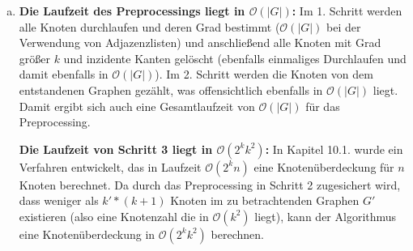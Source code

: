 \documentclass[12pt,a4paper]{article}
\begin{document}
\begin{enumerate}[a)]
	\item \textbf{Die Laufzeit des Preprocessings liegt in \(\mathcal{O}(|G|)\):} Im 1. Schritt werden alle Knoten durchlaufen und deren Grad bestimmt (\(\mathcal{O}(|G|)\) bei der Verwendung von Adjazenzlisten) und anschließend alle Knoten mit Grad größer \(k\) und inzidente Kanten gelöscht (ebenfalls einmaliges Durchlaufen und damit ebenfalls in \(\mathcal{O}(|G|)\)). Im 2. Schritt werden die Knoten von dem entstandenen Graphen gezählt, was offensichtlich ebenfalls in \(\mathcal{O}(|G|)\) liegt. Damit ergibt sich auch eine Gesamtlaufzeit von \(\mathcal{O}(|G|)\) für das Preprocessing.

	\textbf{Die Laufzeit von Schritt 3 liegt in \(\mathcal{O}(2^k k^2)\):} In Kapitel 10.1. wurde ein Verfahren entwickelt, das in Laufzeit \(\mathcal{O}(2^kn)\) eine Knotenüberdeckung für \(n\) Knoten berechnet. Da durch das Preprocessing in Schritt 2 zugesichert wird, dass weniger als \(k'*(k+1)\) Knoten im zu betrachtenden Graphen \(G'\) existieren (also eine Knotenzahl die in \(\mathcal{O}(k^2)\) liegt), kann der Algorithmus eine Knotenüberdeckung in \(\mathcal{O}(2^k k^2)\) berechnen.

\end{enumerate} 
\end{document}
